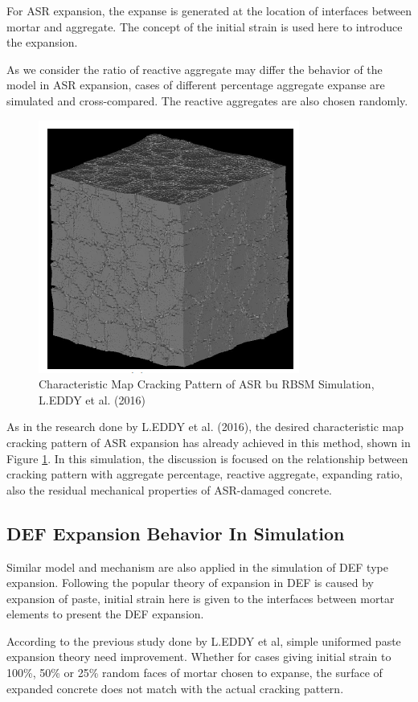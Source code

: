 For ASR expansion, the expanse is generated at the location of interfaces between mortar and aggregate. The concept of the initial strain is used here to introduce the expansion.

As we consider the ratio of reactive aggregate may differ the behavior of the model in ASR expansion,  cases of different percentage aggregate expanse are simulated and cross-compared. The reactive aggregates are also chosen randomly.

\begin{figure}
  \centering
  \includegraphics[width=0.4\linewidth]{Files/Background/EDDY_ASR.png}
  \caption{Characteristic Map Cracking Pattern of ASR bu RBSM Simulation, L.EDDY et al. (2016)\cite{Eddy}}

  \label{ASRgood}
\end{figure}

As in the research done by L.EDDY et al. (2016)\cite{Eddy}, the desired characteristic map cracking pattern of ASR expansion has already achieved in this method, shown in Figure \ref{ASRgood}. In this simulation, the discussion is focused on the relationship between cracking pattern with aggregate percentage, reactive aggregate, expanding ratio, also the residual mechanical properties of ASR-damaged concrete.

\subsection{DEF Expansion Behavior In Simulation}

Similar model and mechanism are also applied in the simulation of DEF  type expansion. Following the popular theory of expansion in DEF  is caused by expansion of paste, initial strain here is given to the interfaces between mortar elements to present the DEF expansion.

According to the previous study done by L.EDDY et al\cite{Eddy}, simple uniformed paste expansion theory need improvement. Whether for cases giving initial strain to 100\%, 50\% or 25\% random faces of mortar chosen to expanse, the surface of expanded concrete does not match with the actual cracking pattern.

